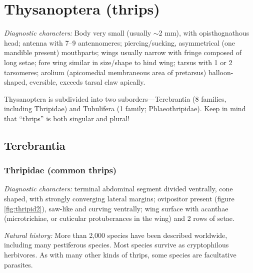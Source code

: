\section{Thysanoptera (thrips)}
\noindent{}\textit{Diagnostic characters:} Body very small (usually $\sim$2 mm), with opisthognathous head; antenna with 7--9 antennomeres; piercing/sucking, asymmetrical (one mandible present) mouthparts; wings usually narrow with fringe composed of long setae; fore wing similar in size/shape to hind wing; tarsus with 1 or 2 tarsomeres; arolium (apicomedial membraneous area of pretarsus) balloon-shaped, eversible, exceeds tarsal claw apically.\vspace{3mm}

\noindent{}Thysanoptera is subdivided into two suborders---Terebrantia (8 families, including Thripidae) and Tubulifera (1 family; Phlaeothripidae). Keep in mind that ``thrips'' is both singular and plural!

\subsection{Terebrantia}%
\subsubsection{Thripidae (common thrips)}
\noindent{}\textit{Diagnostic characters:} terminal abdominal segment divided ventrally, cone shaped, with strongly converging lateral margins; ovipositor present (figure \ref{fig:thripid2}), saw-like and curving ventrally; wing surface with acanthae (microtrichiae, or cuticular protuberances in the wing) and 2 rows of setae.\vspace{3mm}

\noindent{}\textit{Natural history:} More than 2,000 species have been described worldwide, including many pestiferous species. Most species survive as cryptophilous herbivores. As with many other kinds of thrips, some species are facultative parasites.\vspace{3mm}

